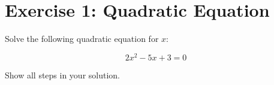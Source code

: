 \documentclass{article}
\begin{document}
\section*{Exercise 1: Quadratic Equation}

Solve the following quadratic equation for $x$:

$$2x^2 - 5x + 3 = 0$$

Show all steps in your solution.
\end{document}
